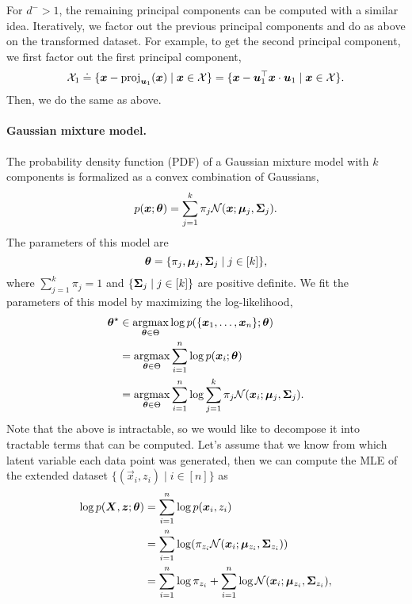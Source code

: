 For $d^- > 1$, the remaining principal components can be computed with a similar idea. Iteratively,
we factor out the previous principal components and do as above on the transformed dataset. For
example, to get the second principal component, we first factor out the first principal component, \[
    \mathcal{X}_1 \doteq \{ \bm{x} - \mathrm{proj}_{\bm{u}_1}(\bm{x}) \mid \bm{x} \in \mathcal{X} \} = \{ \bm{x} - \bm{u}_1^\top \bm{x} \cdot \bm{u}_1 \mid \bm{x} \in \mathcal{X} \} .
\]
Then, we do the same as above.

\paragraph{Gaussian mixture model.}

The probability density function (PDF) of a Gaussian mixture model with $k$ components is
formalized as a convex combination of Gaussians, \[
    p(\bm{x}; \bm{\theta}) = \sum_{j=1}^{k} \pi_j \mathcal{N}(\bm{x}; \bm{\mu}_j, \bm{\Sigma}_j).
\]
The parameters of this model are \[
    \bm{\theta} = \{ \pi_j, \bm{\mu}_j, \bm{\Sigma}_j \mid j \in [k] \},
\]
where $\sum_{j=1}^{k} \pi_j = 1$ and $\{ \bm{\Sigma}_j \mid j \in [k] \}$ are positive definite.
We fit the parameters of this model by maximizing the log-likelihood,
\begin{align*}
    \bm{\theta}^\star & \in \operatorname*{argmax}_{\bm{\theta} \in \Theta} \log p(\{ \bm{x}_1, \ldots, \bm{x}_n \}; \bm{\theta})                                    \\
                       & = \operatorname*{argmax}_{\bm{\theta} \in \Theta} \sum_{i=1}^{n} \log p(\bm{x}_i; \bm{\theta})                                                \\
                       & = \operatorname*{argmax}_{\bm{\theta} \in \Theta} \sum_{i=1}^{n} \log \sum_{j=1}^{k} \pi_j \mathcal{N}(\bm{x}_i; \bm{\mu}_j, \bm{\Sigma}_j).
\end{align*}
Note that the above is intractable, so we would like to decompose it into tractable terms that can be
computed. Let's assume that we know from which latent variable each data point was generated, then we
can compute the MLE of the extended dataset $\{ (\vec{x}_i, z_i) \mid i \in [n] \}$ as
\begin{align*}
    \log p(\mat{X}, \vec{z}; \vec{\theta}) & = \sum_{i=1}^{n} \log p(\vec{x}_i, z_i)                                                                            \\
                                           & = \sum_{i=1}^{n} \log \lft( \pi_{z_i} \mathcal{N}(\vec{x}_i; \vec{\mu}_{z_i}, \mat{\Sigma}_{z_i}) \rgt)            \\
                                           & = \sum_{i=1}^{n} \log \pi_{z_i} + \sum_{i=1}^{n} \log \mathcal{N}(\vec{x}_i; \vec{\mu}_{z_i}, \mat{\Sigma}_{z_i}),
\end{align*}
